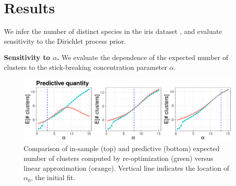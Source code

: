 \documentclass[a0,plainsections,30pt]{sciposter}\usepackage[]{graphicx}\usepackage[]{color}
\newenvironment{knitrout}{}{} %
\newcommand{\Expect}{\mathbb{E}}
\newcommand{\etazopt}{\eta_z^{*}}
\newcommand{\etathetaopt}{\eta_\theta^{*}}
\newcommand{\QExpect}
{\Expect_{q\left(\theta, z \vert \eta_\theta, \etazopt(\eta_\theta)\right)}}
\begin{document}
\begin{minipage}[t]{0.45\textwidth}




\section*{Results}
\vspace{-0.3in}
We infer the number of distinct species in the iris
dataset \cite{iris_data_anderson}, and evaluate sensitivity to the Dirichlet process prior.
\vspace{0.1in}

{\bf \large Sensitivity to $\alpha$.}
We evaluate the dependence of the expected number of clusters to the stick-breaking concentration parameter $\alpha$.

\vspace{0.05in}




\begin{figure}
\centering
\begin{knitrout}
\color{fgcolor}

{\centering \includegraphics[width=0.98\linewidth,height=0.294\linewidth]{figure/param_sens_plot_thresh_0-1} 

}



\end{knitrout}
\caption{Comparison of in-sample (top) and predictive (bottom) expected number of clusters computed by re-optimization (green) versus linear approximation (orange).
Vertical line indicates the location of $\alpha_0$, the initial fit. }
\end{figure}


\end{minipage}
\end{document}
